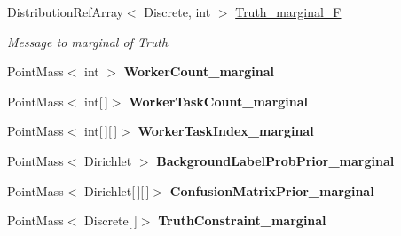 \begin{DoxyCompactItemize}
Distribution\+Ref\+Array$<$ Discrete, int $>$ \hyperlink{class_microsoft_research_1_1_infer_1_1_models_1_1_user_1_1_model___e_p_ac0f71b3998592b33f9b4025f39d97a40}{Truth\+\_\+marginal\+\_\+\+F}
\begin{DoxyCompactList}\small\item\em Message to marginal of \textquotesingle{}Truth\textquotesingle{}\end{DoxyCompactList}\item 
\hypertarget{class_microsoft_research_1_1_infer_1_1_models_1_1_user_1_1_model___e_p_ac05ae9eb4c7d49051bba627421994ad6}{}Point\+Mass$<$ int $>$ {\bfseries Worker\+Count\+\_\+marginal}\label{class_microsoft_research_1_1_infer_1_1_models_1_1_user_1_1_model___e_p_ac05ae9eb4c7d49051bba627421994ad6}

\item 
\hypertarget{class_microsoft_research_1_1_infer_1_1_models_1_1_user_1_1_model___e_p_ac236fcc7606e7135faf98300bdda2840}{}Point\+Mass$<$ int\mbox{[}$\,$\mbox{]}$>$ {\bfseries Worker\+Task\+Count\+\_\+marginal}\label{class_microsoft_research_1_1_infer_1_1_models_1_1_user_1_1_model___e_p_ac236fcc7606e7135faf98300bdda2840}

\item 
\hypertarget{class_microsoft_research_1_1_infer_1_1_models_1_1_user_1_1_model___e_p_abac4131c53e234262731e0a07c3852e6}{}Point\+Mass$<$ int\mbox{[}$\,$\mbox{]}\mbox{[}$\,$\mbox{]}$>$ {\bfseries Worker\+Task\+Index\+\_\+marginal}\label{class_microsoft_research_1_1_infer_1_1_models_1_1_user_1_1_model___e_p_abac4131c53e234262731e0a07c3852e6}

\item 
\hypertarget{class_microsoft_research_1_1_infer_1_1_models_1_1_user_1_1_model___e_p_a111766b07f18f7783077a68d3b1c989f}{}Point\+Mass$<$ Dirichlet $>$ {\bfseries Background\+Label\+Prob\+Prior\+\_\+marginal}\label{class_microsoft_research_1_1_infer_1_1_models_1_1_user_1_1_model___e_p_a111766b07f18f7783077a68d3b1c989f}

\item 
\hypertarget{class_microsoft_research_1_1_infer_1_1_models_1_1_user_1_1_model___e_p_a03edc2556c23997e63776a990ec4a6c2}{}Point\+Mass$<$ Dirichlet\mbox{[}$\,$\mbox{]}\mbox{[}$\,$\mbox{]}$>$ {\bfseries Confusion\+Matrix\+Prior\+\_\+marginal}\label{class_microsoft_research_1_1_infer_1_1_models_1_1_user_1_1_model___e_p_a03edc2556c23997e63776a990ec4a6c2}

\item 
\hypertarget{class_microsoft_research_1_1_infer_1_1_models_1_1_user_1_1_model___e_p_a3745e965cabc6957ea9eecfcd4015df5}{}Point\+Mass$<$ Discrete\mbox{[}$\,$\mbox{]}$>$ {\bfseries Truth\+Constraint\+\_\+marginal}\label{class_microsoft_research_1_1_infer_1_1_models_1_1_user_1_1_model___e_p_a3745e965cabc6957ea9eecfcd4015df5}


\end{DoxyCompactItemize}
